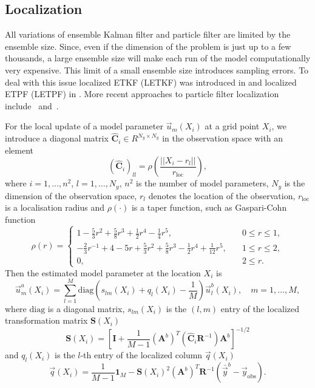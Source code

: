 \documentclass[12, a4paper]{article}
\numberwithin{equation}{section}
\begin{document}
\subsection{Localization}  
All variations of ensemble Kalman filter and particle filter are limited by the ensemble size. 
Since, even if the dimension of the problem is just up to a few thousands, a large ensemble size will make each run of the 
model computationally very expensive. This limit of a small ensemble size introduces sampling errors.  
To deal with this issue localized ETKF (LETKF) was introduced in \cite{Huetal07} and localized ETPF (LETPF) in \cite{ReCo15}. More recent approaches to particle filter localization include~\cite{PeMi16} and~\cite{Po16}.

For the local update of a model parameter $\vec{u}_m(X_i)$ at a grid point $X_i$, we  introduce a diagonal matrix $\hat{\textbf{C}}_i \in R^{N_y \times N_y}$ in the observation space with an element 
\begin{equation}\label{rho_matrix}
(\hat{\textbf{C}}_i)_{ll} =\rho \left(\frac{||{{X}_i -{r}_l}||}{r_\textrm{loc}}\right),
\end{equation}
where $i=1,\hdots,n^2$,   $l=1,\hdots,N_y$, $n^2$ is the number of model parameters, $N_y$ is the dimension of the observation space, ${r}_l$ denotes the location of the observation, $r_\textrm{loc}$ is a localisation radius and $\rho(\cdot)$ is a taper function, such as Gaspari-Cohn function \cite{GaCo99}
\begin{equation}
\rho(r) = 
\begin{cases}
1-\frac{5}{3}r^2 + \frac{5}{8} r^3+\frac{1}{2}r^4-\frac{1}{4}r^5, &  \quad 0 \leq r \leq 1, \\
-\frac{2}{3}r^{-1}+4-5r+\frac{5}{3}r^2+\frac{5}{8}r^3-\frac{1}{2}r^4+\frac{1}{12}r^5, &  \quad 1 \leq r \leq 2, \\
0, & \quad 2 \leq r.
\end{cases}  \nonumber
\end{equation}
Then the estimated model parameter at the location $X_i$ is 
\begin{equation*}%
{\vec{u}}^a_m(X_i)  = \sum_{l=1}^{M} \text{diag}\left( s_{lm}(X_i) + q_l (X_i)- \frac{1}{M}\right)\vec{u}^b_l(X_i),\quad m = 1,\hdots,M,
\end{equation*}
where $\text{diag}$ is a diagonal matrix, $s_{lm}(X_i)$ is the $(l,m)$ entry of  the localized transformation matrix $\textbf{S}(X_i)$
\begin{equation*}
\textbf{S}(X_i) = \left[ \textbf{I}+\frac{1}{M-1} (\textbf{A}^b)^T (\hat{\textbf{C}}_i\textbf{R}^{-1}) \textbf{A}^b\right]^{-1/2}
\end{equation*}
and $q_l(X_i)$ is the $l$-th entry of the localized column $\vec{q}(X_i)$
\begin{equation*}
\vec{q}(X_i) = \frac{1}{M-1}\textbf{1}_M - \textbf{S}(X_i)^2(\textbf{A}^b)^T \textbf{R}^{-1} (\bar{\vec{y}}^b - \vec{y}_{\text{obs}} ).
\end{equation*}
\end{document}
